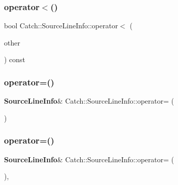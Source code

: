 \mbox{\label{struct_catch_1_1_source_line_info_af77415416919d2d6030b4be085b92f7a}} 
\subsubsection{operator$<$()}
{\footnotesize\ttfamily bool Catch\+::\+Source\+Line\+Info\+::operator$<$ (\begin{DoxyParamCaption}\item[{\textbf{ Source\+Line\+Info} const \&}]{other }\end{DoxyParamCaption}) const\hspace{0.3cm}{\ttfamily [noexcept]}}

\mbox{\label{struct_catch_1_1_source_line_info_a1a6cfc0197357ef4e329bb256aa8a354}} 
\subsubsection{operator=()\hspace{0.1cm}{\footnotesize\ttfamily [1/2]}}
{\footnotesize\ttfamily \textbf{ Source\+Line\+Info}\& Catch\+::\+Source\+Line\+Info\+::operator= (\begin{DoxyParamCaption}\item[{\textbf{ Source\+Line\+Info} const \&}]{ }\end{DoxyParamCaption})\hspace{0.3cm}{\ttfamily [default]}}

\mbox{\label{struct_catch_1_1_source_line_info_ab8469b89d86bdd69b6b9f2b610600258}} 
\subsubsection{operator=()\hspace{0.1cm}{\footnotesize\ttfamily [2/2]}}
{\footnotesize\ttfamily \textbf{ Source\+Line\+Info}\& Catch\+::\+Source\+Line\+Info\+::operator= (\begin{DoxyParamCaption}\item[{\textbf{ Source\+Line\+Info} \&\&}]{ }\end{DoxyParamCaption})\hspace{0.3cm}{\ttfamily [default]}, {\ttfamily [noexcept]}}

